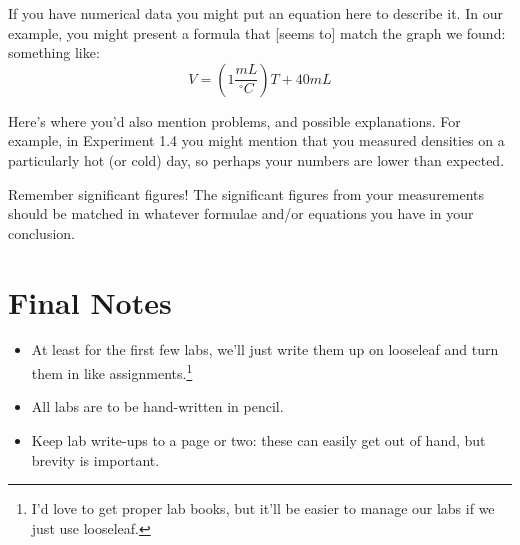 \documentclass[12pt, oneside]{article}   	%
\begin{document}
If you have numerical data you might put an equation here to describe it. In our example, you might present a formula that [seems to] match the graph we found: something like:\\  $$ V = (1 \frac{mL}{^{\circ}C}) T + 40mL $$

Here's where you'd also mention problems, and possible explanations. For example, in Experiment 1.4 you might mention that you measured densities on a particularly hot (or cold) day, so perhaps your numbers are lower than expected.

Remember significant figures! The significant figures from your measurements should be matched in whatever formulae and/or equations you have in your conclusion. 

\section{Final Notes}
\begin{itemize}
\item At least for the first few labs, we'll just write them up on looseleaf and turn them in like assignments.\footnote{I'd love to get proper lab books, but it'll be easier to manage our labs if we just use looseleaf.}
\item All labs are to be hand-written in pencil.
\item Keep lab write-ups to a page or two: these can easily get out of hand, but brevity is important.
\end{itemize}
\end{document}
